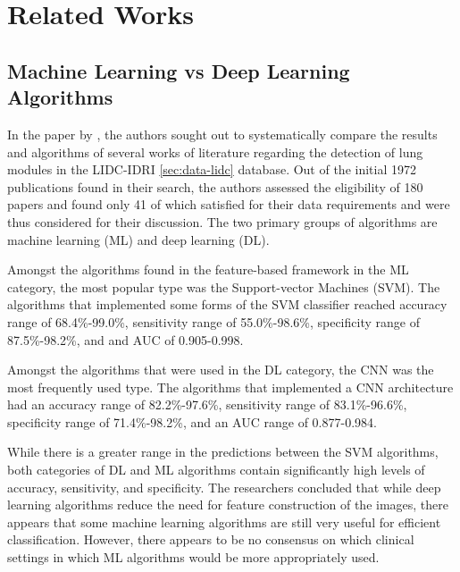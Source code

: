 \documentclass[10pt,twocolumn,letterpaper]{article}
\begin{document}

\section{Related Works} \label{sec:related}

   \subsection{Machine Learning vs Deep Learning Algorithms} \label{sec:related-dl-vs-ml}
      In the paper by \cite{ml_vs_dl}, the authors sought out to systematically compare the results and algorithms of
      several works of literature regarding the detection of lung modules in the LIDC-IDRI \ref{sec:data-lidc} database.
      Out of the initial 1972 publications found in their search, the authors assessed the eligibility of 180 papers
      and found only 41 of which satisfied for their data requirements and were thus considered for their discussion.
      The two primary groups of algorithms are machine learning (ML) and deep learning (DL).

      Amongst the algorithms found in the feature-based framework in the ML category, the most popular
      type was the Support-vector Machines (SVM). The algorithms that implemented some forms of the SVM classifier
      reached accuracy range of 68.4\%-99.0\%, sensitivity range of 55.0\%-98.6\%, specificity range of 87.5\%-98.2\%, and
      and AUC of 0.905-0.998.
    
      Amongst the algorithms that were used in the DL category, the CNN was the most
      frequently used type. The algorithms that implemented a CNN architecture had an accuracy range of 82.2\%-97.6\%,
      sensitivity range of 83.1\%-96.6\%, specificity range of 71.4\%-98.2\%, and an AUC range of 0.877-0.984.

      While there is a greater range in the predictions between the SVM algorithms, both categories of DL and ML algorithms
      contain significantly high levels of accuracy, sensitivity, and specificity. The researchers concluded that
      while deep learning algorithms reduce the need for feature construction of the images, there appears that some
      machine learning algorithms are still very useful for efficient classification. However, there appears to be no
      consensus on which clinical settings in which ML algorithms would be more appropriately used.
\end{document}
